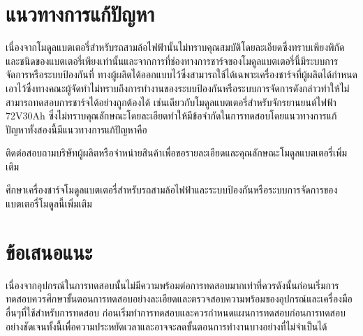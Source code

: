 \section{แนวทางการแก้ปัญหา}
เนื่องจากโมดูลแบตเตอรี่สำหรับรถสามล้อไฟฟ้านั้นไม่ทราบคุณสมบัติโดยละเอียดซึ่งทราบเพียงพิกัดและชนิดของแบตเตอรี่เพียงเท่านั้นและจากการที่ช่องทางการชาร์จของโมดูลแบตเตอรี่นี้มีระบบการจัดการหรือระบบป้องกันที่
ทางผู้ผลิตได้ออกแบบไว้ซึ่งสามารถใช้ได้เฉพาะเครื่องชาร์จที่ผู้ผลิตได้กำหนดเอาไว้ซึ่งทางคณะผู้จัดทำไม่ทราบถึงการทำงานของระบบป้องกันหรือระบบการจัดการดังกล่าวทำให้ไม่สามารถทดสอบการชาร์จได้อย่างถูกต้องได้
เช่นเดียวกับโมดูลแบตเตอรี่สำหรับจักรยานยนต์ไฟฟ้า 72V30Ah ซึ่งไม่ทราบคุณลักษณะโดยละเอียดทำให้มีข้อจำกัดในการทดสอบโดยแนวทางการแก้ปัญหาทั้งสองนี้มีแนวทางการแก้ปัญหาคือ
\begin{itemize}
{\item ติดต่อสอบถามบริษัทผู้ผลิตหรือจำหน่ายสินค้าเพื่อขอรายละเอียดและคุณลักษณะโมดูลแบตเตอรี่เพิ่มเติม}
{\item ศึกษาเครื่องชาร์จโมดูลแบตเตอรี่สำหรับรถสามล้อไฟฟ้าและระบบป้องกันหรือระบบการจัดการของแบตเตอรี่โมดูลนี้เพิ่มเติม}
\end{itemize}
\section{ข้อเสนอแนะ}
เนื่องจากอุปกรณ์ในการทดสอบนั้นไม่มีความพร้อมต่อการทดสอบมากเท่าที่ควรดังนั้นก่อนเริ่มการทดสอบควรศึกษาขั้นตอนการทดสอบอย่างละเอียดและตรวจสอบความพร้อมของอุปกรณ์และเครื่องมืออื่นๆที่ใช้สำหรับการทดสอบ
ก่อนเริ่มทำการทดสอบและควรกำหนดแผนการทดสอบก่อนการทดสอบอย่างชัดเจนทั้งนี้เพื่อความประหยัดเวลาและอาจจะลดขั้นตอนการทำงานบางอย่างที่ไม่จำเป็นได้












